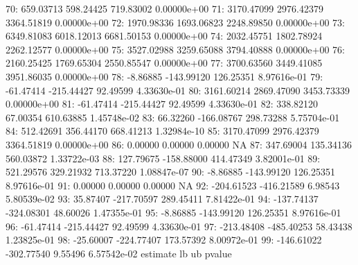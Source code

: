 \begin{Schunk}
\begin{Soutput}
70:  659.03713  598.24425  719.83002 0.00000e+00
71: 3170.47099 2976.42379 3364.51819 0.00000e+00
72: 1970.98336 1693.06823 2248.89850 0.00000e+00
73: 6349.81083 6018.12013 6681.50153 0.00000e+00
74: 2032.45751 1802.78924 2262.12577 0.00000e+00
75: 3527.02988 3259.65088 3794.40888 0.00000e+00
76: 2160.25425 1769.65304 2550.85547 0.00000e+00
77: 3700.63560 3449.41085 3951.86035 0.00000e+00
78:   -8.86885 -143.99120  126.25351 8.97616e-01
79:  -61.47414 -215.44427   92.49599 4.33630e-01
80: 3161.60214 2869.47090 3453.73339 0.00000e+00
81:  -61.47414 -215.44427   92.49599 4.33630e-01
82:  338.82120   67.00354  610.63885 1.45748e-02
83:   66.32260 -166.08767  298.73288 5.75704e-01
84:  512.42691  356.44170  668.41213 1.32984e-10
85: 3170.47099 2976.42379 3364.51819 0.00000e+00
86:    0.00000    0.00000    0.00000          NA
87:  347.69004  135.34136  560.03872 1.33722e-03
88:  127.79675 -158.88000  414.47349 3.82001e-01
89:  521.29576  329.21932  713.37220 1.08847e-07
90:   -8.86885 -143.99120  126.25351 8.97616e-01
91:    0.00000    0.00000    0.00000          NA
92: -204.61523 -416.21589    6.98543 5.80539e-02
93:   35.87407 -217.70597  289.45411 7.81422e-01
94: -137.74137 -324.08301   48.60026 1.47355e-01
95:   -8.86885 -143.99120  126.25351 8.97616e-01
96:  -61.47414 -215.44427   92.49599 4.33630e-01
97: -213.48408 -485.40253   58.43438 1.23825e-01
98:  -25.60007 -224.77407  173.57392 8.00972e-01
99: -146.61022 -302.77540    9.55496 6.57542e-02
      estimate         lb         ub      pvalue
\end{Soutput}
\end{Schunk}
